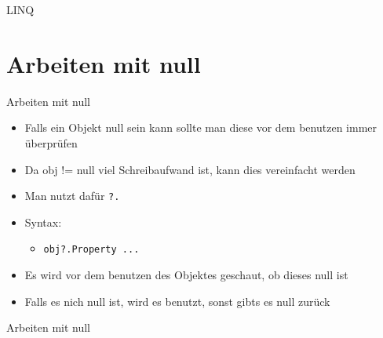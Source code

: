 \begin{frame}{LINQ}
		
\end{frame}

\section{Arbeiten mit null}
\begin{frame}{Arbeiten mit null}
	\begin{itemize}
		\item Falls ein Objekt \alert{null} sein kann sollte man diese vor dem benutzen immer überprüfen
		\item Da \alert{obj != null} viel Schreibaufwand ist, kann dies vereinfacht werden	
	\end{itemize}
	\begin{itemize}
		\item Man nutzt dafür \texttt{\alert{?.}}
		\item Syntax:
		\begin{itemize}
			\item \texttt{obj\alert{?.}Property ...}
		\end{itemize}
		\item Es wird vor dem benutzen des Objektes geschaut, ob dieses \alert{null} ist
		\item Falls es nich \alert{null} ist, wird es benutzt, sonst gibts es \alert{null} zurück
	\end{itemize}
\end{frame}

\begin{frame}{Arbeiten mit null}
		
		
\end{frame}

